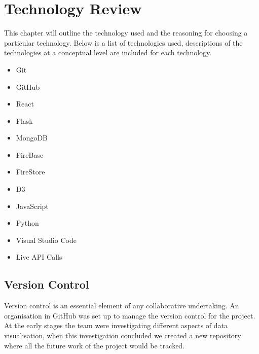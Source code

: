 \vspace{70mm} %


\chapter{Technology Review}
This chapter will outline the technology used and the reasoning for choosing a particular technology. Below is a list of technologies used, descriptions of the technologies at a conceptual level are included for each technology.
\begin{itemize}
\item Git
\item GitHub
\item React
\item Flask
\item MongoDB
\item FireBase
\item FireStore
\item D3
\item JavaScript
\item Python
\item Visual Studio Code
\item Live API Calls

\end{itemize}

\section{Version Control}
Version control is an essential element of any collaborative undertaking. An organisation in GitHub was set up to manage the version control for the project. At the early stages the team were investigating different aspects of data visualisation, when this investigation concluded we created a new repository where all the future work of the project would be tracked.
